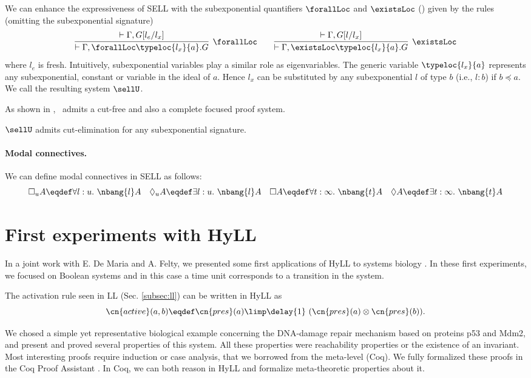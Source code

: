 \documentclass{llncs}
\begin{document}
We can enhance  the expressiveness of SELL with the subexponential quantifiers $\forallLoc$ and $\existsLoc$ (\cite{NigamOlartePimentel:concur-13,OlartePimentelNigam:tcs-15})
given by the rules (omitting the subexponential signature)
\[
 \infer[\forallLoc]{\vdash\Gamma, \forallLoc \typeloc{l_x}{a}. G}
 {\vdash \Gamma , G[l_{e}/l_x]}
\qquad
 \infer[\existsLoc]{ \vdash\Gamma, \existsLoc \typeloc{l_x}{a}. G}
 {\vdash\Gamma , G[l/l_x]}
\]
where   $l_e$ is fresh. 
Intuitively, subexponential variables play a similar role as eigenvariables. 
The generic variable $\typeloc{l_x}{a}$ represents any subexponential,
constant or variable in the ideal of $a$. Hence $l_x$ can be substituted 
by any  subexponential $l$ of type $b$ (i.e., $l:b$) if 
$b\preceq a$. 
We call the resulting system $\sellU$.

As shown in \cite{NigamOlartePimentel:concur-13,OlartePimentelNigam:tcs-15}, 
\sellU\ admits a cut-free and also a complete focused proof system.

 \begin{theorem}
$\sellU$ admits cut-elimination for any subexponential signature. %
\end{theorem}

\paragraph{Modal connectives.} 
We can define modal connectives in SELL as follows: 
$$
       \Box_u A  \eqdef \forall l:u.~ \nbang{l}A \quad
       \Diamond_u A  \eqdef \exists l:u.~ \nbang{l}A \quad
       \Box A  \eqdef \forall t:\infty.~ \nbang{t}A \quad
       \Diamond A  \eqdef \exists t:\infty.~ \nbang{t}A
$$ 

\section{First experiments with HyLL}
In a joint work with E. De Maria and A. Felty,
we presented some first applications of HyLL to systems biology 
\cite{deMaria-Despeyroux-Felty:14-fmmb}.  
In these first experiments, we focused on Boolean systems and 
in this case a time unit corresponds to a transition in the system.

The activation rule seen in LL (Sec. \ref{subsec:ll}) can be written in HyLL as
$$\cn{active}(a,b) \eqdef 
\cn{pres}(a) \limp \delay{1}~ (\cn{pres}(a) \otimes \cn{pres}(b)).$$

We chosed a simple yet representative biological example concerning
the DNA-damage repair mechanism based on proteins p53 and Mdm2, 
and present and proved several properties of this system.
%
All these properties were reachability properties or the existence of an 
invariant. Most interesting proofs require induction or case analysis, 
that we borrowed from the meta-level (Coq).
%
We fully formalized these proofs 
in the Coq Proof Assistant \cite{BertotCasteran:2004}.
In Coq, we can both reason in HyLL and 
formalize meta-theoretic properties about it.
\end{document}

